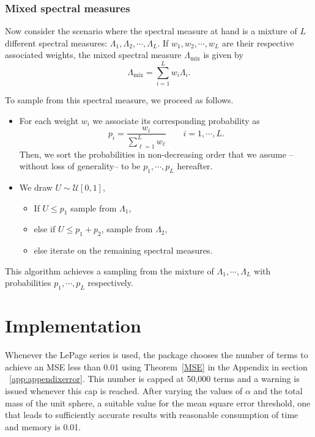 \subsubsection{Mixed spectral measures}
\label{mixtures}

Now consider the scenario where the spectral measure at hand is a mixture of $L$ different spectral measures: $\Lambda_1, \Lambda_2, \cdots, \Lambda_L$. If $w_1, w_2, \cdots, w_L$ are their respective associated weights, the mixed spectral measure $\Lambda_{\text{mix}}$ is given by
\[
    \Lambda_{\text{mix}}=\sum_{i=1}^L w_i\Lambda_i.
\]

To sample from this spectral measure, we proceed as follows.
\begin{itemize}
\item[(i)] For each weight $w_i$ we associate its corresponding probability as \[
    p_i = \frac{w_i}{\sum_{\ell=1}^L w_\ell} \qquad i=1, \cdots, L.
\]
Then, we sort the probabilities in non-decreasing order that we assume --without loss of generality-- to be $p_1, \cdots, p_L$ hereafter.

\item[(ii)] We draw   $U\sim\mathcal{U}[0,1]$,
\begin{itemize}
\item[$\bullet$] If $U\leq p_1$ sample from $\Lambda_1$,
\item[$\bullet$] else if $U\leq p_1+p_2$, sample from $\Lambda_2$,
\item[$\bullet$] else iterate on the remaining spectral measures.
\end{itemize}
\end{itemize}

This algorithm achieves a sampling from the mixture of $\Lambda_1, \cdots, \Lambda_L$ with probabilities $p_1, \cdots, p_L$ respectively.

\section{Implementation}

Whenever the LePage series is used, the package chooses the number of terms to achieve an MSE less than 0.01 using Theorem~\ref{MSE} in the Appendix in section ~\ref{app:appendixerror}. This number is capped at 50,000 terms and a warning is issued whenever this cap is reached. After varying the values of $\alpha$ and the total mass of the unit sphere, a suitable value for the mean square error threshold, one that leads to sufficiently accurate results with reasonable consumption of time and memory is 0.01.
